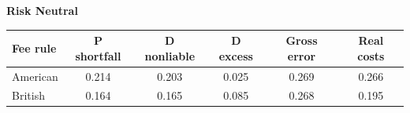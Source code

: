 \documentclass[10pt,border=5pt,varwidth=17cm]{standalone}
\begin{document}
\begingroup
\small
\setlength{\tabcolsep}{5pt}
\renewcommand{\arraystretch}{1.20}
\noindent\textbf{Risk Neutral}\par\smallskip
\noindent\begin{tabularx}{\linewidth}{@{}>{\raggedright\arraybackslash}Xccccc@{}}
\toprule
\textbf{Fee rule} & \textbf{P shortfall} & \textbf{D nonliable} & \textbf{D excess} & \textbf{Gross error} & \textbf{Real costs} \\
\midrule
American & 0.214 & 0.203 & 0.025 & 0.269 & 0.266 \\
British & 0.164 & 0.165 & 0.085 & 0.268 & 0.195 \\
\bottomrule\end{tabularx}\par\medskip
\endgroup
\end{document}
